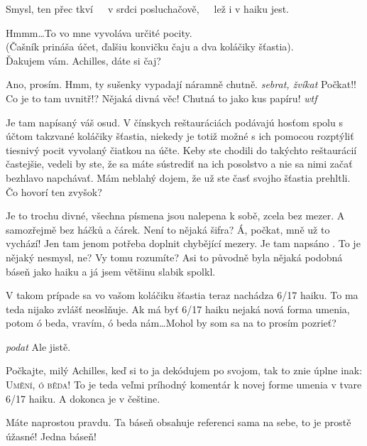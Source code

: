 \documentclass[12pt]{article}
\begin{document}
\begin{description}[itemsep=0pt]
\item[A:] Smysl, ten přec tkví\ \ \ v srdci posluchačově,\ \ \ lež i v haiku jest.

\item[Ž:] Hmmm\dots To vo mne vyvoláva určité pocity.\\
    (Čašník prináša účet, ďalšiu konvičku čaju a dva koláčiky šťastia).\\
    Ďakujem vám. Achilles, dáte si čaj?

\item[A:] Ano, prosím. Hmm, ty sušenky vypadají náramně chutně. \textit{sebrat, žvíkat}
    Počkat!! Co je to tam uvnitř!? Nějaká divná věc! Chutná to jako kus papíru! \textit{wtf}

\item[Ž:] Je tam napísaný váš osud. V čínskych reštauráciách podávajú hosťom spolu s účtom 
    takzvané koláčiky šťastia, niekedy je totiž možné s ich pomocou rozptýliť tiesnivý
    pocit vyvolaný čiatkou na účte. Keby ste chodili do takýchto reštaurácií častejšie, 
    vedeli by ste, že sa máte sústrediť na ich posolstvo a nie sa nimi začať bezhlavo 
    napchávať. Mám neblahý dojem, že už ste časť svojho šťastia prehltli. Čo hovorí ten zvyšok?

\item[A:] Je to trochu divné, všechna písmena jsou nalepena k sobě, zcela bez mezer.
    A samozřejmě bez háčků a čárek. Není to nějaká šifra? Á, počkat, mně už to vychází!
    Jen tam jenom potřeba doplnit chybějící mezery. Je tam napsáno .
    To je nějaký nesmysl, ne? Vy tomu rozumíte? Asi to původně byla nějaká podobná báseň
    jako haiku a já jsem většinu slabik spolkl.

\item[Ž:] V takom prípade sa vo vašom koláčiku šťastia teraz nachádza 6/17 haiku. To ma 
    teda nijako zvlášť neoslňuje. Ak má byť 6/17 haiku nejaká nová forma umenia, potom 
    ó beda, vravím, ó beda nám\dots Mohol by som sa na to prosím pozrieť?

\item[A:] \textit{podat} Ale jistě.

\item[Ž:] Počkajte, milý Achilles, keď si to ja dekódujem po svojom, tak to znie úplne 
    inak: \textsc{Umění, ó běda!} To je teda veľmi príhodný komentár k novej forme 
    umenia v tvare 6/17 haiku. A dokonca je v češtine.

\item[A:] Máte naprostou pravdu. Ta báseň obsahuje referenci sama na sebe, to je prostě
    úžasné! Jedna báseň!


\end{description}
\end{document}

